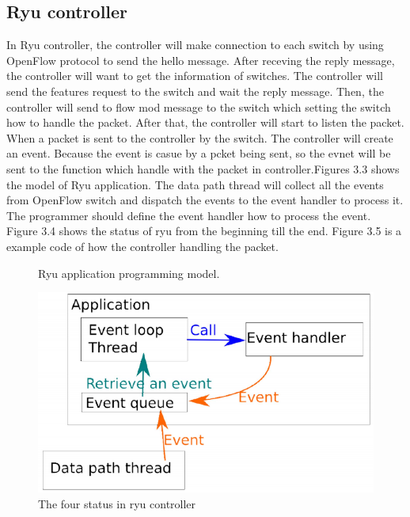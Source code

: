 \documentclass[a4paper,12pt]{report}
\begin{document}
\begin{CJK*}{UTF8}{bkai}
\begin{large}
	    \section{Ryu controller}
	    \qquad In Ryu controller, the controller will make connection to each switch by using OpenFlow protocol to send the hello message. After receving the reply message, the controller will want to get the information of switches. The controller will send the features request to the switch and wait the reply message. Then, the controller will send to flow mod message to the switch which setting the switch how to handle the packet. After that, the controller will start to listen the packet. When a packet is sent to the controller by the switch. The controller will create an event. Because the event is casue by a pcket being sent, so the evnet will be sent to the function which handle with the packet in controller.Figures 3.3 shows the model of Ryu application. The data path thread will collect all the events from OpenFlow switch and dispatch the events to the event handler to process it. The programmer should define the event handler how to process the event. Figure 3.4 shows the status of ryu from the beginning till the end. Figure 3.5 is a example code of how the controller handling the packet.
	     \begin{figure}[p]
	          \caption{Ryu application programming model.}
	          \centering
	            \includegraphics[width=1.0\textwidth]{ryu_model.png}
	          \caption{The four status in ryu controller}

\end{figure}
\end{large}
\end{CJK*}
\end{document}
